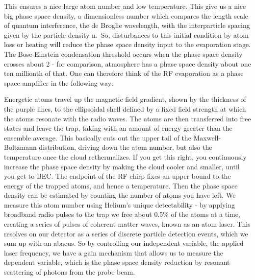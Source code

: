 	This ensures a nice large atom number and low temperature.
	This give us a nice big phase space density, a dimensionless number which compares the length scale of quantum interference, the de Broglie wavelength, with the interparticle spacing given by the particle density n.~So, disturbances to this initial condition by atom loss or heating will reduce the phase space density input to the evaporation stage.
	The Bose-Einstein condensation threshold occurs when the phase space density crosses about 2 - for comparison, atmosphere has a phase space density about one ten millionth of that.
	One can therefore think of the RF evaporation as a phase space amplifier in the following way:

	Energetic atoms travel up the magnetic field gradient, shown by the thickness of the purple lines, to the ellipsoidal shell defined by a fixed field strength at which the atoms resonate with the radio waves.
	The atoms are then transferred into free states and leave the trap, taking with an amount of energy greater than the ensemble average.
	This basically cuts out the upper tail of the Maxwell-Boltzmann distribution, driving down the atom number, but also the temperature once the cloud rethermalizes.
	If you get this right, you continuously increase the phase space density by making the cloud cooler and smaller, until you get to BEC.
	The endpoint of the RF chirp fixes an upper bound to the energy of the trapped atoms, and hence a temperature.
	Then the phase space density can be estimated by counting the number of atoms you have left.
	We measure this atom number using Helium's unique detectability - by applying broadband radio pulses to the trap we free about 0.5\% of the atoms at a time, creating a series of pulses of coherent matter waves, known as an atom laser.
	This resolves on our detector as a series of discrete particle detection events, which we sum up with an abacus.
	So by controlling our independent variable, the applied laser frequency, we have a gain mechanism that allows us to measure the dependent variable, which is the phase space density reduction by resonant scattering of photons from the probe beam.


